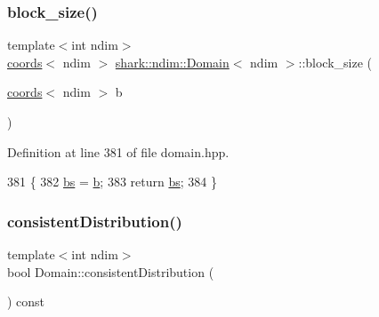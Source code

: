 \subsubsection{\texorpdfstring{block\+\_\+size()}{block\_size()}\hspace{0.1cm}{\footnotesize\ttfamily [4/4]}}
{\footnotesize\ttfamily template$<$int ndim$>$ \\
\hyperlink{structshark_1_1ndim_1_1coords}{coords}$<$ ndim $>$ \hyperlink{classshark_1_1ndim_1_1_domain}{shark\+::ndim\+::\+Domain}$<$ ndim $>$\+::block\+\_\+size (\begin{DoxyParamCaption}\item[{\hyperlink{structshark_1_1ndim_1_1coords}{coords}$<$ ndim $>$}]{b }\end{DoxyParamCaption})\hspace{0.3cm}{\ttfamily [inline]}}



Definition at line 381 of file domain.\+hpp.


\begin{DoxyCode}
381                                                                            \{
382                     \hyperlink{classshark_1_1ndim_1_1_domain_a2be17b3d153f7fbbede6eec0afd17ebe}{bs} = \hyperlink{classshark_1_1ndim_1_1_domain_a3b9ed7ea09cc2d90575a43f92cc4e105}{b};
383                     \textcolor{keywordflow}{return} \hyperlink{classshark_1_1ndim_1_1_domain_a2be17b3d153f7fbbede6eec0afd17ebe}{bs};
384                 \}
\end{DoxyCode}
\hypertarget{classshark_1_1ndim_1_1_domain_af10c994124cd93210194db65d5bb3c5b}{}\label{classshark_1_1ndim_1_1_domain_af10c994124cd93210194db65d5bb3c5b} 
\subsubsection{\texorpdfstring{consistent\+Distribution()}{consistentDistribution()}}
{\footnotesize\ttfamily template$<$int ndim$>$ \\
bool Domain\+::consistent\+Distribution (\begin{DoxyParamCaption}{ }\end{DoxyParamCaption}) const\hspace{0.3cm}{\ttfamily [private]}}



